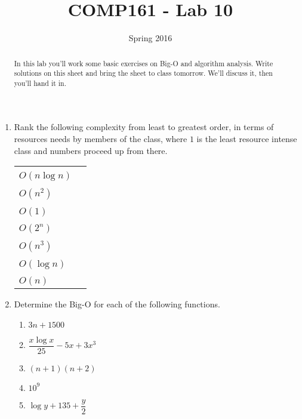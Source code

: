 \documentclass[10pt]{article}
\title{COMP161 - Lab 10}
\author{ }
\date{Spring 2016}
\begin{document}
\maketitle
\thispagestyle{empty}

\begin{abstract}
In this lab you'll work some basic exercises on Big-O and algorithm analysis. Write solutions on this sheet and bring the sheet to class tomorrow. We'll discuss it, then you'll hand it in.
\end{abstract}

\begin{enumerate}
\item Rank the following complexity from least to greatest order, in terms of resources needs by members of the class, where $1$ is the least resource intense class and numbers proceed up from there.

\begin{center}
\begin{tabular}{ll} 
       & \\
$O(n \log n)$ & \underline{\hspace{1.5in}} \\
       & \\
$O(n^2)$ & \underline{\hspace{1.5in}} \\
       & \\
$O(1)$ & \underline{\hspace{1.5in}} \\
       & \\
$O(2^n)$ & \underline{\hspace{1.5in}} \\
       & \\
$O(n^3)$ & \underline{\hspace{1.5in}} \\
       & \\
$O(\log n)$ & \underline{\hspace{1.5in}} \\
       & \\
$O(n)$ & \underline{\hspace{1.5in}} 
\end{tabular}
\end{center}


\item Determine the Big-O for each of the following functions.
\begin{enumerate}
\item $3n+1500$
\vspace{.35in}
\item $\dfrac{x\log x}{25} - 5x + 3x^3$
\vspace{.35in}
\item $(n+1)(n+2)$
\vspace{.35in}
\item $10^9$
\vspace{.35in}
\item $\log y + 135 + \dfrac{y}{2}$
\vspace{.35in}
\end{enumerate}
\newpage \thispagestyle{empty}


\end{enumerate}
\end{document}
